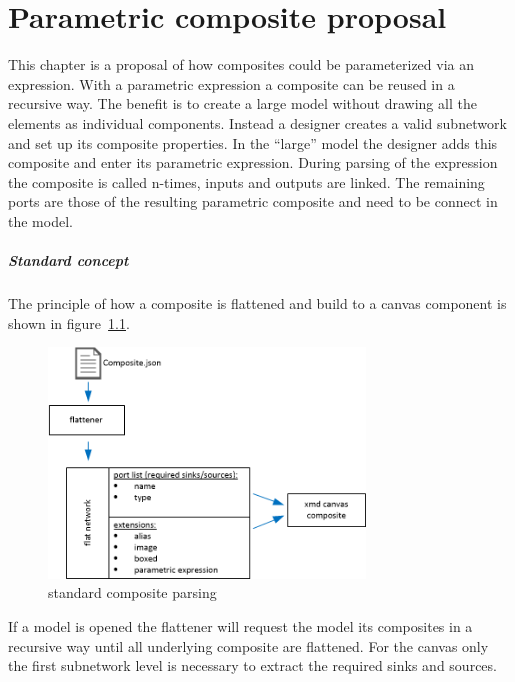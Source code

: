 \chapter{Parametric composite proposal}
\label{sec:parametric}

This chapter is a proposal of how composites could be parameterized via
an expression. With a parametric expression a composite can be reused in a
recursive way. The benefit is to create a large model without drawing all the
elements as individual components. Instead a designer creates a valid subnetwork
and set up its composite properties. In the ``large'' model the designer adds
this composite and enter its parametric expression. During parsing of the
expression the composite is called n-times, inputs and outputs are linked. The
remaining ports are those of the resulting parametric composite and need to be
connect in the model.

\paragraph{Standard concept}

The principle of how a composite is flattened and build to a canvas component is
shown in figure~\ref{fig:standard-composite-parsing}.

\begin{figure}[here]
\includegraphics[width=0.75\textwidth]{pictures/composite-parsing}
\caption{standard composite parsing}
\label{fig:standard-composite-parsing}
\end{figure}

If a model is opened the flattener will request the model its composites in a
recursive way until all underlying composite are flattened. For the canvas only
the first subnetwork level is necessary to extract the required sinks and
sources.


